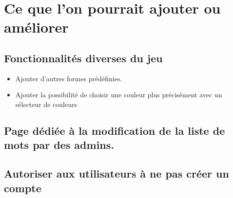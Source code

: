 \documentclass[11pt,a4paper]{article}
\begin{document}
    \section{Ce que l'on pourrait ajouter ou améliorer}
        \subsection{Fonctionnalités diverses du jeu}
        \begin{itemize}
            \item Ajouter d'autres formes prédéfinies.
            \item Ajouter la possibilité de choisir une couleur plus précisément avec un sélecteur de couleurs        
        \end{itemize}

        \subsection{Page dédiée à la modification de la liste de mots par des admins.}
        
        \subsection{Autoriser aux utilisateurs à ne pas créer un compte}
\end{document}
